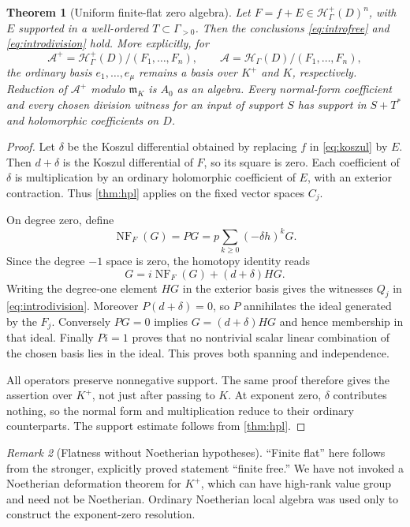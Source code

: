 \documentclass[11pt,letterpaper]{article}
\newtheorem{theorem}{Theorem}[section]
\theoremstyle{definition}
\theoremstyle{remark}
\newtheorem{remark}[theorem]{Remark}
\newcommand{\HH}{\mathcal H}
\newcommand{\mm}{\mathfrak m}
\newcommand{\NF}{\operatorname{NF}}
\newcommand{\Kp}{K^{+}}
\newcommand{\Hp}{\HH^{+}_{\Gamma}}
\newcommand{\Hh}{\HH_{\Gamma}}
\begin{document}
\begin{theorem}[Uniform finite-flat zero algebra]\label{thm:finiteflat}
Let $F=f+E\in\Hp(D)^n$, with $E$ supported in a well-ordered $T\subset\Gamma_{>0}$. Then the conclusions \eqref{eq:introfree} and \eqref{eq:introdivision} hold. More explicitly, for
\[
 \mathcal A^+=\Hp(D)/(F_1,\ldots,F_n),\qquad
 \mathcal A=\Hh(D)/(F_1,\ldots,F_n),
\]
the ordinary basis $e_1,\ldots,e_\mu$ remains a basis over $\Kp$ and $K$, respectively. Reduction of $\mathcal A^+$ modulo $\mm_K$ is $A_0$ as an algebra. Every normal-form coefficient and every chosen division witness for an input of support $S$ has support in $S+T^*$ and holomorphic coefficients on $D$.
\end{theorem}
\begin{proof}
Let $\delta$ be the Koszul differential obtained by replacing $f$ in \eqref{eq:koszul} by $E$. Then $d+\delta$ is the Koszul differential of $F$, so its square is zero. Each coefficient of $\delta$ is multiplication by an ordinary holomorphic coefficient of $E$, with an exterior contraction. Thus \cref{thm:hpl} applies on the fixed vector spaces $C_j$.

On degree zero, define
\begin{equation}\label{eq:NFformula}
 \NF_F(G)=PG=p\sum_{k\geq0}(-\delta h)^kG.
\end{equation}
Since the degree $-1$ space is zero, the homotopy identity reads
\[
 G=i\NF_F(G)+(d+\delta)HG.
\]
Writing the degree-one element $HG$ in the exterior basis gives the witnesses $Q_j$ in \eqref{eq:introdivision}. Moreover $P(d+\delta)=0$, so $P$ annihilates the ideal generated by the $F_j$. Conversely $PG=0$ implies $G=(d+\delta)HG$ and hence membership in that ideal. Finally $Pi=1$ proves that no nontrivial scalar linear combination of the chosen basis lies in the ideal. This proves both spanning and independence.

All operators preserve nonnegative support. The same proof therefore gives the assertion over $\Kp$, not just after passing to $K$. At exponent zero, $\delta$ contributes nothing, so the normal form and multiplication reduce to their ordinary counterparts. The support estimate follows from \cref{thm:hpl}.
\end{proof}

\begin{remark}[Flatness without Noetherian hypotheses]
``Finite flat'' here follows from the stronger, explicitly proved statement ``finite free.'' We have not invoked a Noetherian deformation theorem for $\Kp$, which can have high-rank value group and need not be Noetherian. Ordinary Noetherian local algebra was used only to construct the exponent-zero resolution.
\end{remark}
\end{document}
